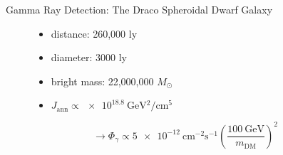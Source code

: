 \documentclass[11pt,a4paper,titlepage]{beamer}
\begin{document}
\begin{frame}{Gamma Ray Detection: The Draco Spheroidal Dwarf Galaxy}
\begin{figure}
\begin{minipage}{0.48\textwidth}
\begin{itemize}
\item distance: 260,000 ly\medskip
\item diameter: 3000 ly\medskip
\item bright mass: 22,000,000 $M_{\odot}$\medskip
\item $J_\text{ann}\propto\SI{e18.8}{\giga\eV^2\per\centi\meter^5}$
\end{itemize}
\end{minipage}
\begin{minipage}{0.5\textwidth}
\centering
\end{minipage}
\begin{minipage}{\textwidth}
\[
\rightarrow\Phi_\gamma\propto \SI{5e-12}{\centi\meter^{-2}\second^{-1}}\left(\frac{\SI{100}{\giga\eV}}{m_\text{DM}}\right)^2
\]
\end{minipage}
\end{figure}
\end{frame}
\end{document}
